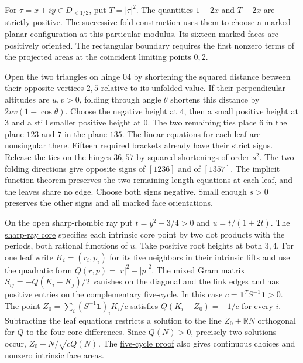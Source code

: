 \documentclass[11pt,letterpaper]{amsart}
\newcommand{\R}{\mathbb R}
\newcommand{\release}{bd3a0e03908481d738df30233cf95c641a1d3f71}
\newcommand{\reporef}[2]{\href{https://github.com/vltanh/lean4-origami-torus/blob/\release/#1}{#2}}
\begin{document}
For \(\tau=x+iy\in D_{<1/2}\), put \(T=|\tau|^2\).
The quantities \(1-2x\) and \(T-2x\) are strictly positive.
The \reporef{docs/EightVertex/Type5OffRayConstruction.md}{successive-fold construction}
uses them to choose a marked planar configuration at this particular
modulus. Its sixteen marked faces are positively oriented.
The rectangular boundary requires the first nonzero terms of the
projected areas at the coincident limiting points \(0,2\).

Open the two triangles on hinge \(04\) by shortening the squared
distance between their opposite vertices \(2,5\) relative to its
unfolded value. If their perpendicular altitudes are \(u,v>0\),
folding through angle \(\theta\) shortens this distance by
\(2uv(1-\cos\theta)\). Choose the negative height at \(4\), then a
small positive height at \(3\) and a still smaller positive height at
\(0\). The two remaining ties place \(6\) in the plane \(123\) and
\(7\) in the plane \(135\). The linear equations for each leaf are
nonsingular there. Fifteen required brackets already have their strict
signs. Release the ties on the hinges \(36,57\) by squared shortenings
of order \(s^2\). The two folding directions give opposite signs of
\([1236]\) and of \([1357]\). The implicit function theorem preserves
the two remaining length equations at each leaf, and the leaves share
no edge. Choose both signs negative. Small enough \(s>0\) preserves
the other signs and all marked face orientations.

On the open sharp-rhombic ray put \(t=y^2-3/4>0\) and
\(u=t/(1+2t)\). The
\reporef{docs/EightVertex/Type5SharpEmbeddings.md}{sharp-ray core}
specifies each intrinsic core point by two dot products with the
periods, both rational functions of \(u\). Take positive
root heights at both \(3,4\). For one leaf write \(K_i=(r_i,p_i)\)
for its five neighbors in their intrinsic lifts and use the quadratic
form \(Q(r,p)=|r|^2-|p|^2\).
The mixed Gram matrix \(S_{ij}=-Q(K_i-K_j)/2\) vanishes on the
diagonal and the link edges and has positive entries on the
complementary five-cycle. In this case
\(c=\mathbf1^TS^{-1}\mathbf1>0\). The point
\(Z_0=\sum_i(S^{-1}\mathbf1)_iK_i/c\) satisfies
\(Q(K_i-Z_0)=-1/c\) for every \(i\). Subtracting the leaf equations
restricts a solution to the line \(Z_0+\R N\) orthogonal for \(Q\)
to the four core differences. Since \(Q(N)>0\), precisely two
solutions occur, \(Z_0\pm N/\sqrt{cQ(N)}\). The
\reporef{docs/EightVertex/Type5PositiveCycle.md}{five-cycle proof}
also gives continuous choices and nonzero intrinsic face areas.
\end{document}
